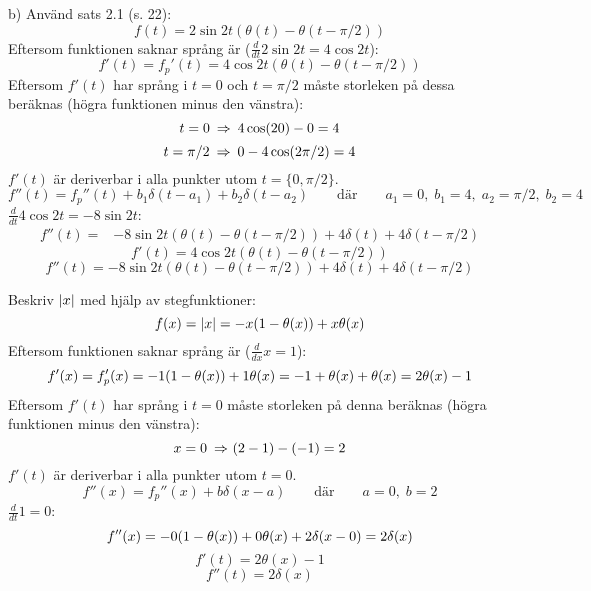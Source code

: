 \begin{task}{b)}
	Använd sats 2.1 (s. 22):
	\[f(t)= 2\sin 2t(\theta(t)-\theta(t-\pi/2))\]
	Eftersom funktionen saknar språng är ($\frac{d}{dt}2\sin 2t=4\cos2t$):
	\[f'(t)=f_p'(t)=4\cos2t(\theta(t)-\theta(t-\pi/2))\]
	Eftersom $f'(t)$ har språng i $t=0$ och $t=\pi/2$ måste storleken på dessa beräknas (högra funktionen minus den vänstra):
	\[t=0 \ra 4\cos(2\*0)-0=4\]
	\[t=\pi/2 \ra 0-4\cos(2\*\pi/2)=4\]
	$f'(t)$ är deriverbar i alla punkter utom $t=\{0,\pi/2\}$.
	\[f''(t)=f_p''(t)+b_1\delta(t-a_1)+b_2\delta(t-a_2) \qquad\text{där}\qquad a_1=0,\;b_1=4,\;a_2=\pi/2,\;b_2=4\]
	$\frac{d}{dt}4\cos2t=-8\sin2t$:
	\begin{align*}
	f''(t)=
	&-8\sin2t(\theta(t)-\theta(t-\pi/2))+4\delta(t)+4\delta(t-\pi/2)
	\end{align*}
	\ans 
	\[f'(t)=4\cos2t(\theta(t)-\theta(t-\pi/2))\]
	\[f''(t)=-8\sin2t(\theta(t)-\theta(t-\pi/2))+4\delta(t)+4\delta(t-\pi/2)\]
\end{task}

\begin{task}{2.11}
	Beskriv $\left|x\right|$ med hjälp av stegfunktioner:
	\[f(x) = \left|x\right| = -x(1-\theta(x))+x\theta(x)\]
	Eftersom funktionen saknar språng är ($\frac{d}{dx}x=1$):
	\[f'(x)=f_p'(x) = -1\*(1-\theta(x))+1\*\theta(x) = -1+\theta(x)+\theta(x) = 2\theta(x)-1\]
	Eftersom $f'(t)$ har språng i $t=0$ måste storleken på denna beräknas (högra funktionen minus den vänstra):
	\[x=0 \ra (2-1)-(-1)=2\]
	$f'(t)$ är deriverbar i alla punkter utom $t=0$.
	\[f''(x)=f_p''(x)+b\delta(x-a)\qquad\text{där}\qquad a=0,\;b=2\]
	$\frac{d}{dt}1=0$:
	\[f''(x) = -0\*(1-\theta(x))+0\*\theta(x)+2\delta(x-0)=2\delta(x)\]
	\ans 
	\[f'(t)=2\theta(x)-1\]
	\[f''(t)=2\delta(x)\]
\end{task}